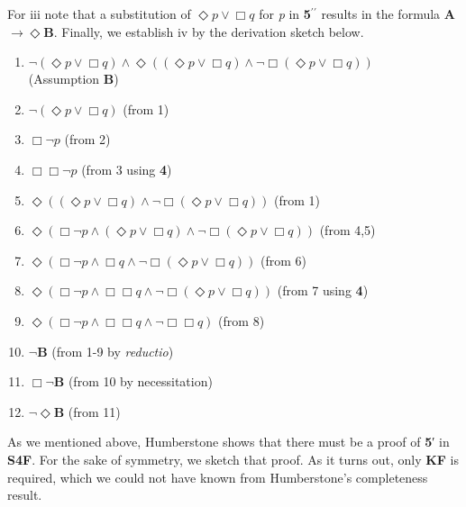 \documentclass[
  11pt,
  letterpaper,
  DIV=11,
  numbers=noendperiod,
  twoside]{scrartcl}
\providecommand{\tightlist}{%
  \setlength{\itemsep}{0pt}\setlength{\parskip}{0pt}}\usepackage{longtable,booktabs,array}
\begin{document}
For iii note that a substitution of \(\Diamond{p}\vee \Box q\) for
\emph{p} in \textbf{5}\(^{\prime\prime}\) results in the formula
\textbf{A}\(\rightarrow \Diamond\textbf{B}\). Finally, we establish iv
by the derivation sketch below.

\begin{enumerate}
\def\labelenumi{\arabic{enumi}.}
\tightlist
\item
  \(\neg (\Diamond{p}\vee \Box q) \wedge \Diamond((\Diamond{p}\vee \Box q) \wedge \neg \Box (\Diamond{p}\vee \Box q))\)\\
  (Assumption \textbf{B})
\item
  \(\neg (\Diamond{p}\vee \Box q)\) (from 1)
\item
  \(\Box \neg p\) (from 2)
\item
  \(\Box \Box \neg p\) (from 3 using \textbf{4})
\item
  \(\Diamond((\Diamond{p}\vee \Box q) \wedge \neg \Box (\Diamond{p}\vee \Box q))\)
  (from 1)
\item
  \(\Diamond(\Box \neg p \wedge (\Diamond{p}\vee \Box q) \wedge \neg \Box (\Diamond{p}\vee \Box q))\)
  (from 4,5)
\item
  \(\Diamond(\Box \neg p \wedge \Box q \wedge \neg \Box (\Diamond{p}\vee \Box q))\)
  (from 6)
\item
  \(\Diamond(\Box \neg p \wedge \Box \Box q \wedge \neg \Box (\Diamond{p}\vee \Box q))\)
  (from 7 using \textbf{4})
\item
  \(\Diamond(\Box \neg p \wedge \Box \Box q \wedge \neg \Box \Box q)\)
  (from 8)
\item
  \(\neg\)\textbf{B} (from 1-9 by \emph{reductio})
\item
  \(\Box \neg\)\textbf{B} (from 10 by necessitation)
\item
  \(\neg \Diamond\)\textbf{B} (from 11)
\end{enumerate}

As we mentioned above, Humberstone shows that there must be a proof of
\textbf{5}′ in \textbf{S4F}. For the sake of symmetry, we sketch that
proof. As it turns out, only \textbf{KF} is required, which we could not
have known from Humberstone's completeness result.
\end{document}
